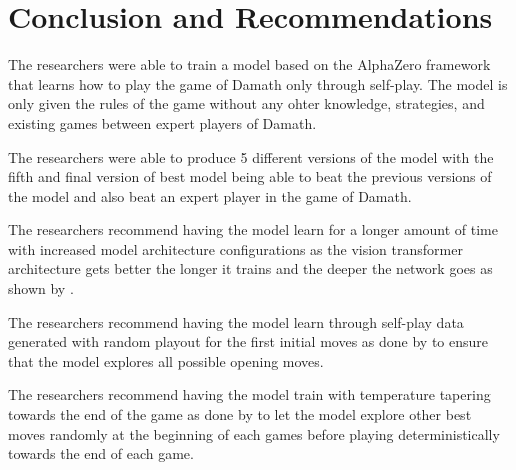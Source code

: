 \chapter{Conclusion and Recommendations}

The researchers were able to train a model based on the AlphaZero framework that learns how to play the game of Damath only through self-play. The model is only given the rules of the game without any ohter knowledge, strategies, and existing games between expert players of Damath.

The researchers were able to produce 5 different versions of the model with the fifth and final version of best model being able to beat the previous versions of the model and also beat an expert player in the game of Damath.

The researchers recommend having the model learn for a longer amount of time with increased model architecture configurations as the vision transformer architecture gets better the longer it trains and the deeper the network goes as shown by \cite{dosovitskiy2021imageworth16x16words}.

The researchers recommend having the model learn through self-play data generated with random playout for the first initial moves as done by \cite{Popic_Boskovic_Brest_2021} to ensure that the model explores all possible opening moves.

The researchers recommend having the model train with temperature tapering towards the end of the game as done by \cite{silver2017masteringchessshogiselfplay} to let the model explore other best moves randomly at the beginning of each games before playing deterministically towards the end of each game.
